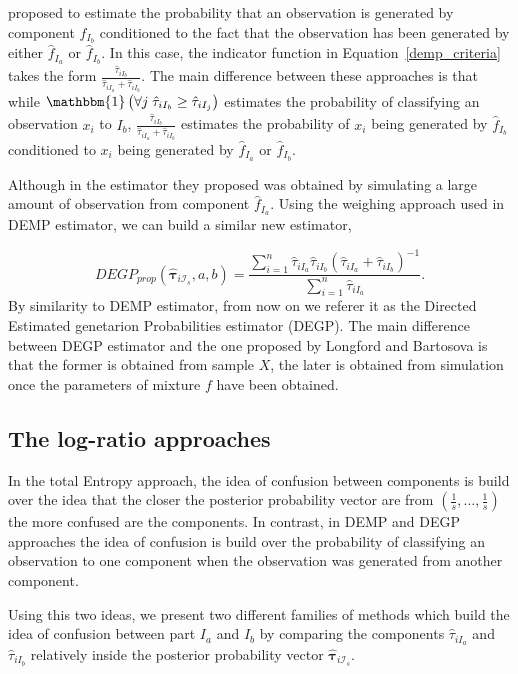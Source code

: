 \documentclass[10pt, a4paper]{article}
\newcommand{\m}[1]{\boldsymbol{#1}}
\begin{document}
\cite{longford2014} proposed to estimate the probability that an observation is generated by component $\hat{f}_{I_b}$ conditioned to the fact that the observation has been generated by either $\hat{f}_{I_a}$ or $\hat{f}_{I_b}$. In this case, the indicator function in Equation~\ref{demp_criteria} takes the form $\frac{\hat{\tau}_{iI_b}}{\hat{\tau}_{iI_a} + \hat{\tau}_{iI_b}}$. The main difference between these approaches is that while $\mathbbm{1}\left( \forall j\; \hat{\tau}_{i I_{b}} \geq \hat{\tau}_{iI_j} \right)$ estimates the probability of classifying an observation $x_i$ to $I_b$, $\frac{\hat{\tau}_{iI_b}}{\hat{\tau}_{iI_a} + \hat{\tau}_{iI_b}}$ estimates the probability of $x_i$ being generated by $\hat{f}_{I_b}$ conditioned to $x_i$  being generated by $\hat{f}_{I_a}$ or $\hat{f}_{I_b}$.

Although in  \cite{longford2014} the estimator they proposed was obtained by simulating a large amount of observation from component $\hat{f}_{I_a}$. Using the weighing approach used in DEMP estimator, we can build a similar new estimator, 

\begin{equation}\label{demp2_criteria}
DEGP_{prop}(\hat{\m \tau}_{i \mathcal{I}_s}, a, b) =\frac{ \sum_{i=1}^n \hat{\tau}_{iI_a} \hat{\tau}_{iI_b}(\hat{\tau}_{iI_a} + \hat{\tau}_{iI_b})^{-1}  }{\sum_{i=1}^n \hat{\tau}_{iI_a} }.
\end{equation}
By similarity to DEMP estimator, from now on we referer it as the Directed Estimated genetarion Probabilities estimator (DEGP). The main difference between DEGP estimator and the one proposed by Longford and Bartosova is that the former is obtained from sample $X$, the later is obtained from simulation once the parameters of mixture $f$ have been obtained.


\subsection{The log-ratio approaches}
\label{lr_approach}

In the total Entropy approach, the idea of confusion between components is build over the idea that the closer the posterior probability vector are from $(\frac{1}{s}, \dots, \frac{1}{s})$ the more confused are the components. In contrast, in DEMP and DEGP approaches the idea of confusion is build over the probability of classifying an observation to one component when the observation was generated from another component.

Using this two ideas, we present two different families of methods which build the idea of confusion between part $I_a$ and $I_b$ by comparing the components $\hat{\tau}_{iI_a}$ and $\hat{\tau}_{iI_b}$ relatively inside the posterior probability vector $\hat{\m \tau}_{i \mathcal{I}_s}$. 
\end{document}
